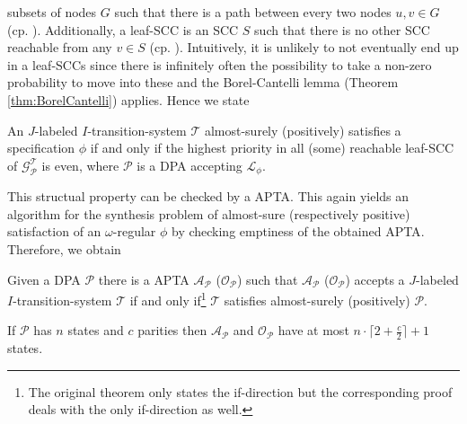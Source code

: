 subsets of nodes $G$ such that there is a path between every two nodes
$u,v\in G$ (cp. \cite{Tarjan}). Additionally, a leaf-\ac{SCC} is an \ac{SCC}
$S$ such that there is no other \ac{SCC} reachable from any $v\in S$ (cp.
\cite[Bottom-\ac{SCC}]{ComplexProbVerification}). Intuitively, it is unlikely
to not eventually end up in a leaf-\acp{SCC} since there is infinitely often
the possibility to take a non-zero probability to move into these and the
Borel-Cantelli lemma (Theorem \ref{thm:BorelCantelli}) applies. Hence we state
\begin{lemma}
  \cite[Lemma 1]{SynProbEnv}
  An $J$-labeled $I$-transition-system $\mathcal{T}$ almost-surely (positively)
  satisfies a specification $\phi$ if and only if the highest priority in all
  (some) reachable leaf-\ac{SCC} of $\mathcal{G}_{\mathcal{P}}^{\mathcal{T}}$
  is even, where $\mathcal{P}$ is a \ac{DPA} accepting $\mathcal{L}_{\phi}$.
\end{lemma}
This structual property can be checked by a \ac{APTA}. This again yields an
algorithm for the synthesis problem of almost-sure (respectively positive)
satisfaction of an $\omega$-regular $\phi$ by checking emptiness of the
obtained \ac{APTA}. Therefore, we obtain
\begin{theorem}
  \cite[Theorem 1]{SynProbEnv}
  Given a \ac{DPA} $\mathcal{P}$ there is a \ac{APTA} 
  $\mathcal{A}_{\mathcal{P}}$ ($\mathcal{O}_{\mathcal{P}}$) such that 
  $\mathcal{A}_{\mathcal{P}}$ ($\mathcal{O}_{\mathcal{P}}$) accepts a 
  $J$-labeled $I$-transition-system $\mathcal{T}$ if and only 
  if\footnote{The original theorem only states the if-direction but the 
  corresponding proof deals with the only if-direction as well.} $\mathcal{T}$ 
  satisfies almost-surely (positively) $\mathcal{P}$.

  If $\mathcal{P}$ has $n$ states and $c$ parities then 
  $\mathcal{A}_{\mathcal{P}}$ and $\mathcal{O}_{\mathcal{P}}$ have at most
  $n\cdot\lceil 2 + \frac{c}{2}\rceil + 1$ states.
  \label{thm:probenvsynthesis}
\end{theorem}
